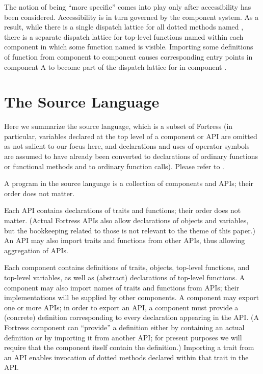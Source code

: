 The notion of being ``more specific'' comes into play only after
accessibility has been considered.  Accessibility is in turn governed
by the component system.  As a result, while there is a single dispatch
lattice for all dotted methods named ,
there is a separate dispatch lattice for top-level functions named 
within each component in which some function named  is visible.
Importing some definitions of function  from component  to component 
causes corresponding entry points in component A to become part of the
dispatch lattice for  in component .


\section{The Source Language}

Here we summarize the source language, which is a subset of Fortress (in
particular, variables declared at the top level of a component or API are
omitted as not salient to our focus here, and declarations and uses of operator
symbols are assumed to have already been converted to declarations of ordinary
functions or functional methods and to ordinary function calls).
Please refer to .

A program in the source language is a collection of components and APIs; their order does not matter.

Each API contains declarations of traits and functions; their order does not matter.
(Actual Fortress APIs also allow declarations of objects and variables, but the bookkeeping
related to those is not relevant to the theme of this paper.)
An API may also import traits and functions from other APIs,
thus allowing aggregation of APIs.

Each component contains definitions of traits, objects, top-level functions, and top-level variables,
as well as (abstract) declarations of top-level functions.  A component may also import names of
traits and functions from APIs; their implementations will be supplied by other components.
A component may export one or more APIs; in order to export an API, a component must
provide a (concrete) definition corresponding to every declaration appearing in the API.
(A Fortress component can ``provide'' a definition either by containing an actual definition
or by importing it from another API; for present purposes we will require that the
component itself contain the definition.)  Importing a trait from an API enables invocation of
dotted methods declared within that trait in the API.

